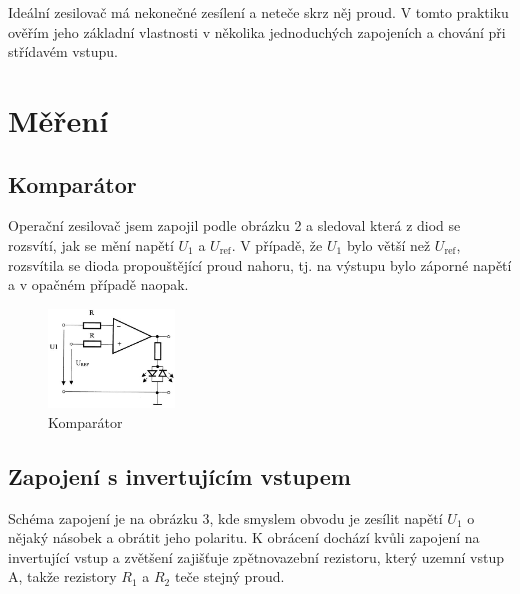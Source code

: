 \documentclass[a4paper,11pt]{article}
\begin{document}

Ideální zesilovač má nekonečné zesílení a neteče skrz něj proud. V tomto praktiku ověřím jeho základní vlastnosti v několika jednoduchých zapojeních a chování při střídavém vstupu.

\section{Měření}

\subsection{Komparátor}

Operační zesilovač jsem zapojil podle obrázku 2 a sledoval která z diod se rozsvítí, jak se mění napětí $ U_1 $  a $ U_\text{ref} $. V případě, že $ U_1 $ bylo větší než $ U_{\text{ref}} $, rozsvítila se dioda propouštějící proud nahoru, tj. na výstupu bylo záporné napětí a v opačném případě naopak.

\begin{figure}[h]
    \centering
    \includegraphics[width=0.3\textwidth]{komparator.jpg}
    \caption{Komparátor}
    \vspace{-10pt}
\end{figure}

\subsection{Zapojení s invertujícím vstupem}

Schéma zapojení je na obrázku 3, kde smyslem obvodu je zesílit napětí $ U_1 $ o nějaký násobek a obrátit jeho polaritu. K obrácení dochází kvůli zapojení na invertující vstup a zvětšení zajišťuje zpětnovazební rezistoru, který uzemní vstup A, takže rezistory $ R_1 $ a $ R_2 $ teče stejný proud.
\end{document}
